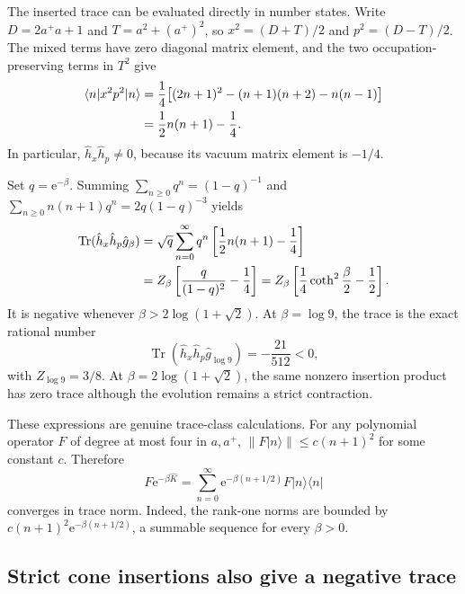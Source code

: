 \documentclass[11pt,a4paper]{article}
\newcommand{\Tr}{\operatorname{Tr}}
\newcommand{\ee}{\mathrm e}
\theoremstyle{remark}
\numberwithin{equation}{section}
\begin{document}
The inserted trace can be evaluated directly in number states. Write
\(D=2a^+a+1\) and \(T=a^2+(a^+)^2\), so
\(x^2=(D+T)/2\) and \(p^2=(D-T)/2\). The mixed terms have zero diagonal
matrix element, and the two occupation-preserving terms in \(T^2\) give
\begin{align}
\langle n|x^2p^2|n\rangle
&=\frac14\bigl[(2n+1)^2-(n+1)(n+2)-n(n-1)\bigr]\notag\\
&=\frac12n(n+1)-\frac14.
\label{eq:number_diagonal}
\end{align}
In particular, \(\hat h_x\hat h_p\ne0\), because its vacuum matrix
element is \(-1/4\).

Set \(q=\ee^{-\beta}\). Summing
\(\sum_{n\geq0}q^n=(1-q)^{-1}\) and
\(\sum_{n\geq0}n(n+1)q^n=2q(1-q)^{-3}\) yields
\begin{align}
\Tr(\hat h_x\hat h_p\hat g_\beta)
&=\sqrt q\sum_{n=0}^\infty q^n
\left[\frac12n(n+1)-\frac14\right]\notag\\
&=Z_\beta\left[\frac{q}{(1-q)^2}-\frac14\right]
=Z_\beta\left[\frac14\coth^2\frac\beta2-\frac12\right].
\label{eq:negative_thermal_formula}
\end{align}
It is negative whenever \(\beta>2\log(1+\sqrt2)\). At
\(\beta=\log9\), the trace is the exact rational number
\begin{equation}
\boxed{\Tr(\hat h_x\hat h_p\hat g_{\log9})=-\frac{21}{512}<0,}
\label{eq:negative_rational}
\end{equation}
with \(Z_{\log9}=3/8\). At \(\beta=2\log(1+\sqrt2)\), the same
nonzero insertion product has zero trace although the evolution remains a
strict contraction.

These expressions are genuine trace-class calculations. For any polynomial
operator \(F\) of degree at most four in \(a,a^+\),
\(\|F|n\rangle\|\leq c(n+1)^2\) for some constant \(c\). Therefore
\begin{equation}
F\ee^{-\beta\hat K}
=\sum_{n=0}^\infty\ee^{-\beta(n+1/2)}
F|n\rangle\langle n|
\label{eq:trace_norm_expansion}
\end{equation}
converges in trace norm. Indeed, the rank-one norms are bounded by
\(c(n+1)^2\ee^{-\beta(n+1/2)}\), a summable sequence for every \(\beta>0\).

\subsection{Strict cone insertions also give a negative trace}
\end{document}
